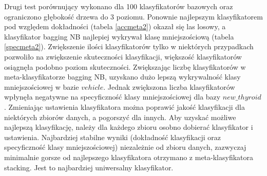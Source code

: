 Drugi test porównujący wykonano dla 100 klasyfikatorów bazowych oraz ograniczono głębokość drzewa do 3 poziomu. Ponownie najlepszym klasyfikatorem pod względem dokładności (tabela \ref{accmeta2}) okazał się las losowy, a klasyfikator bagging NB najlepiej wykrywał klasę mniejszościową (tabela \ref{specmeta2}). Zwiększenie ilości klasyfikatorów tylko w niektórych przypadkach pozwoliło na zwiększenie skuteczności klasyfikacji, większość klasyfikatorów osiągnęła podobno poziom skuteczności. Zwiększając liczbę klasyfikatorów w meta-klasyfikatorze bagging NB, uzyskano dużo lepszą wykrywalność klasy mniejszościowej w bazie $vehicle$. Jednak zwiększona liczba klasyfikatorów wpłynęła negatywne na specyficzność klasy mniejszościowej dla bazy $new\_thyroid$. Zmieniając ustawienia klasyfikatora można poprawić jakość klasyfikacji dla niektórych zbiorów danych, a pogorszyć dla innych. Aby uzyskać możliwe najlepszą klasyfikację, należy dla każdego zbioru osobno dobierać klasyfikator i ustawienia. Najbardziej stabilne wyniki (dokładność klasyfikacji oraz specyficzność klasy mniejszościowej) niezależnie od zbioru danych, zazwyczaj minimalnie gorsze od najlepszego klasyfikatora otrzymano z meta-klasyfikatora stacking. Jest to najbardziej uniwersalny klasyfikator.
